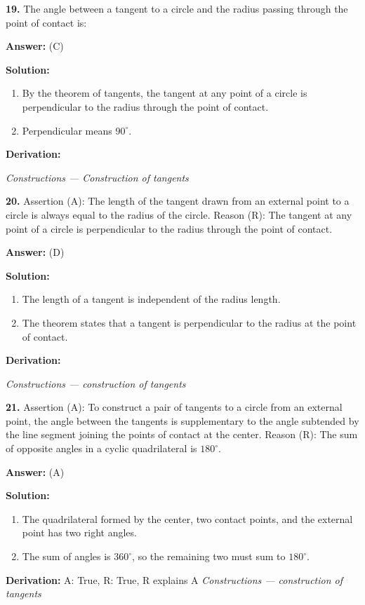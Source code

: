 \documentclass[12pt,a4paper]{exam}
\newcommand{\fitmath}[1]{%
  \sbox{\schmathbox}{$\displaystyle #1$}%
  \ifdim\wd\schmathbox>\linewidth
    \resizebox{\linewidth}{!}{\usebox{\schmathbox}}%
  \else
    \usebox{\schmathbox}%
  \fi}
\begin{document}
\begin{questions}
\question \textbf{19.} The angle between a tangent to a circle and the radius passing through the point of contact is:

\textbf{Answer:}
(C)

\textbf{Solution:}
\begin{enumerate}
  \item By the theorem of tangents, the tangent at any point of a circle is perpendicular to the radius through the point of contact.
  \item Perpendicular means $90^{\circ}$.
\end{enumerate}
\textbf{Derivation:}
\begin{center}
\fitmath{\text{Angle} = 90^{\circ}}
\end{center}
\hfill \textit{Constructions — Construction of tangents}
\vspace{0.3cm}

\question \textbf{20.} Assertion (A): The length of the tangent drawn from an external point to a circle is always equal to the radius of the circle. Reason (R): The tangent at any point of a circle is perpendicular to the radius through the point of contact.

\textbf{Answer:}
(D)

\textbf{Solution:}
\begin{enumerate}
  \item The length of a tangent is independent of the radius length.
  \item The theorem states that a tangent is perpendicular to the radius at the point of contact.
\end{enumerate}
\textbf{Derivation:}
\begin{center}
\fitmath{A: \text{False}, R: \text{True}}
\end{center}
\hfill \textit{Constructions — construction of tangents}
\vspace{0.3cm}

\question \textbf{21.} Assertion (A): To construct a pair of tangents to a circle from an external point, the angle between the tangents is supplementary to the angle subtended by the line segment joining the points of contact at the center. Reason (R): The sum of opposite angles in a cyclic quadrilateral is $180^\circ$.

\textbf{Answer:}
(A)

\textbf{Solution:}
\begin{enumerate}
  \item The quadrilateral formed by the center, two contact points, and the external point has two right angles.
  \item The sum of angles is $360^\circ$, so the remaining two must sum to $180^\circ$.
\end{enumerate}
\textbf{Derivation:}
A: True, R: True, R explains A
\hfill \textit{Constructions — construction of tangents}
\vspace{0.3cm}


\end{questions}
\end{document}
